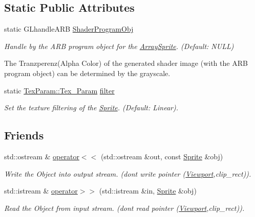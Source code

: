 \subsection*{Static Public Attributes}
\begin{DoxyCompactItemize}
\item 
\hypertarget{class_f2_c_1_1_sprite_adb167a247bc75717c96e587e3b2c8993}{
static GLhandleARB \hyperlink{class_f2_c_1_1_sprite_adb167a247bc75717c96e587e3b2c8993}{ShaderProgramObj}}
\label{class_f2_c_1_1_sprite_adb167a247bc75717c96e587e3b2c8993}

\begin{DoxyCompactList}\small\item\em Handle by the ARB program object for the \hyperlink{class_f2_c_1_1_array_sprite}{ArraySprite}. (Default: NULL) \par
 The Tranzperenz(Alpha Color) of the generated shader image (with the ARB program object) can be determined by the grayscale. \item\end{DoxyCompactList}\item 
\hypertarget{class_f2_c_1_1_sprite_afdc906dcee337188d0a8bc5b054c5e09}{
static \hyperlink{namespace_f2_c_1_1_tex_param_a64299c3972944468af4e8b0394c936c6}{TexParam::Tex\_\-Param} \hyperlink{class_f2_c_1_1_sprite_afdc906dcee337188d0a8bc5b054c5e09}{filter}}
\label{class_f2_c_1_1_sprite_afdc906dcee337188d0a8bc5b054c5e09}

\begin{DoxyCompactList}\small\item\em Set the texture filtering of the \hyperlink{class_f2_c_1_1_sprite}{Sprite}. (Default: Linear). \item\end{DoxyCompactList}\end{DoxyCompactItemize}
\subsection*{Friends}
\begin{DoxyCompactItemize}
\item 
std::ostream \& \hyperlink{class_f2_c_1_1_sprite_a0b5b0f19eaf4188e211f3bc41b82673c}{operator$<$$<$} (std::ostream \&out, const \hyperlink{class_f2_c_1_1_sprite}{Sprite} \&obj)
\begin{DoxyCompactList}\small\item\em Write the Object into output stream. (dont write pointer (\hyperlink{class_f2_c_1_1_viewport}{Viewport},clip\_\-rect)). \item\end{DoxyCompactList}\item 
std::istream \& \hyperlink{class_f2_c_1_1_sprite_a591a1f6d79479eca4af4b3d55e85a562}{operator$>$$>$} (std::istream \&in, \hyperlink{class_f2_c_1_1_sprite}{Sprite} \&obj)
\begin{DoxyCompactList}\small\item\em Read the Object from input stream. (dont read pointer (\hyperlink{class_f2_c_1_1_viewport}{Viewport},clip\_\-rect)). \item\end{DoxyCompactList}\end{DoxyCompactItemize}


